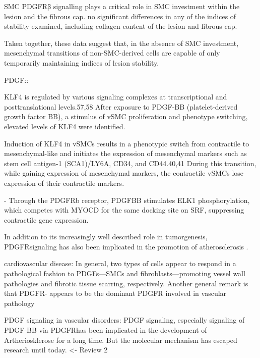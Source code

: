 SMC PDGFRβ signalling plays a critical role in SMC investment within the lesion and the fibrous cap. no significant differences in any of the indices of stability examined, including collagen content of the lesion and fibrous cap.

Taken together, these data suggest that, in the absence of SMC investment, mesenchymal transitions of non-SMC-derived cells are capable of only temporarily maintaining indices of lesion stability.
\cite{newmanMultipleCellTypes2021}

PDGF::


    KLF4 is regulated by various signaling complexes at transcriptional and posttranslational levels.57,58 After exposure to PDGF-BB (platelet-derived growth factor BB), a stimulus of vSMC proliferation and phenotype switching, elevated levels of KLF4 were identified.

    Induction of KLF4 in vSMCs results in a phenotypic switch from contractile to mesenchymal-like and initiates the expression of mesenchymal markers such as stem cell antigen-1 (SCA1)/LY6A, CD34, and CD44.40,41 During this transition, while gaining expression of mesenchymal markers, the contractile vSMCs lose expression of their contractile markers.
    \cite{yapSixShadesVascular2021}


    -   Through the PDGFRb receptor, PDGFBB stimulates ELK1 phosphorylation, which competes with MYOCD for the same docking site on SRF, suppressing contractile gene expression. \cite{grootaertVascularSmoothMuscle2021}

    In addition to its increasingly well described role in tumorgenesis, PDGFR\beta signaling has also been implicated in the promotion of atherosclerosis \cite{andraeRolePlateletderivedGrowth2008, hePDGFRvSignallingRegulates2015}.

    cardiovascular disease: In general, two types of cells appear to respond in a pathological fashion to PDGFs—SMCs and fibroblasts—promoting vessel wall pathologies and fibrotic tissue scarring, respectively. Another general remark is that PDGFR- appears to be the dominant PDGFR involved in vascular pathology

    PDGF signaling in vascular disorders: PDGF signaling, especially signaling of PDGF-BB via PDGFR\beta has been implicated in the development of Artheriosklerose for a long time. But the molecular mechanism has escaped research until today. \cite{chenPlateletderivedGrowthFactors2013}
    \cite{andraeRolePlateletderivedGrowth2008} <- Review 2

